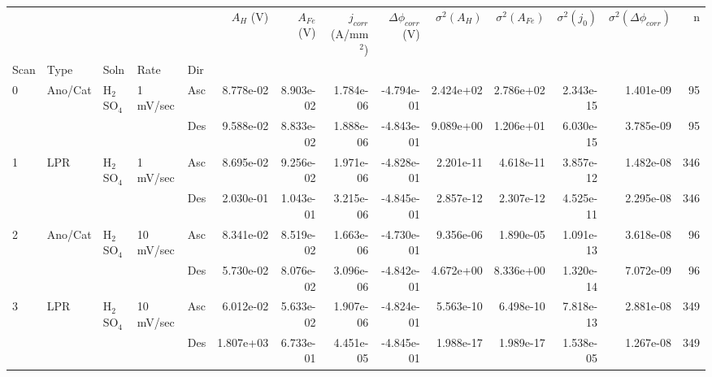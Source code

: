 \begin{tabular}{lllllrrrrrrrrr}
\toprule
  &     &     &           &     &  $A_H$ (V) &  $A_{Fe}$ (V) &  $j_{corr}$ (A/mm$^2$) &  $\Delta \phi_{corr}$ (V) &  $\sigma^2(A_H)$ &  $\sigma^2(A_{Fe})$ &  $\sigma^2(j_0)$ &  $\sigma^2(\Delta \phi_{corr})$ &    n \\
Scan & Type & Soln & Rate & Dir &            &               &                        &                           &                  &                     &                  &                                 &      \\
\midrule
0 & Ano/Cat & H$_2$SO$_4$ & 1 mV/sec & Asc &  8.778e-02 &     8.903e-02 &              1.784e-06 &                -4.794e-01 &        2.424e+02 &           2.786e+02 &        2.343e-15 &                       1.401e-09 &   95 \\
  &     &     &           & Des &  9.588e-02 &     8.833e-02 &              1.888e-06 &                -4.843e-01 &        9.089e+00 &           1.206e+01 &        6.030e-15 &                       3.785e-09 &   95 \\
1 & LPR & H$_2$SO$_4$ & 1 mV/sec & Asc &  8.695e-02 &     9.256e-02 &              1.971e-06 &                -4.828e-01 &        2.201e-11 &           4.618e-11 &        3.857e-12 &                       1.482e-08 &  346 \\
  &     &     &           & Des &  2.030e-01 &     1.043e-01 &              3.215e-06 &                -4.845e-01 &        2.857e-12 &           2.307e-12 &        4.525e-11 &                       2.295e-08 &  346 \\
2 & Ano/Cat & H$_2$SO$_4$ & 10 mV/sec & Asc &  8.341e-02 &     8.519e-02 &              1.663e-06 &                -4.730e-01 &        9.356e-06 &           1.890e-05 &        1.091e-13 &                       3.618e-08 &   96 \\
  &     &     &           & Des &  5.730e-02 &     8.076e-02 &              3.096e-06 &                -4.842e-01 &        4.672e+00 &           8.336e+00 &        1.320e-14 &                       7.072e-09 &   96 \\
3 & LPR & H$_2$SO$_4$ & 10 mV/sec & Asc &  6.012e-02 &     5.633e-02 &              1.907e-06 &                -4.824e-01 &        5.563e-10 &           6.498e-10 &        7.818e-13 &                       2.881e-08 &  349 \\
  &     &     &           & Des &  1.807e+03 &     6.733e-01 &              4.451e-05 &                -4.845e-01 &        1.988e-17 &           1.989e-17 &        1.538e-05 &                       1.267e-08 &  349 \\

\end{tabular}
